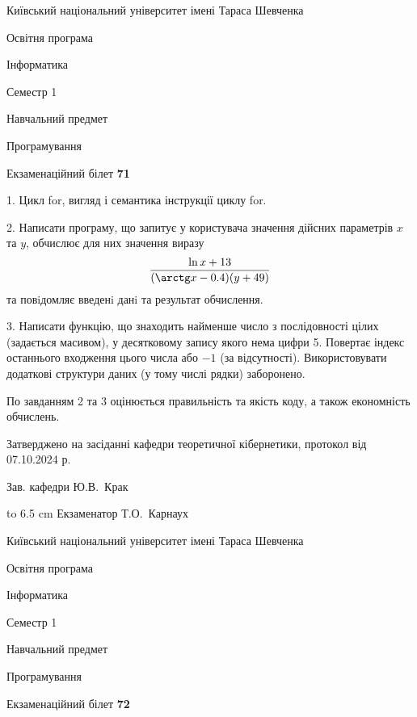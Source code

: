 \documentclass[12pt, ukrainian]{article}
\begin{document}
{{\begin {scriptsize}\par
{ \center  Київський національний університет імені Тараса Шевченка \par}
{\parbox {5 cm}{Освітня програма \hfill}{\parbox {7 cm}{Інформатика\hfill}}\parbox {6 cm}{\hfill Семестр 1}}\par
{\parbox {5 cm} {Навчальний предмет \hfill}\parbox {7 cm}{Програмування \hfill}\parbox {6cm}{\hfill}\par}\vspace{-15pt} \end{scriptsize}}{\center Екзаменаційний білет \No \textbf { 71 }\par}}
{%
1. Цикл for, вигляд і семантика інструкції циклу for.%
\par
2. Написати програму, що запитує у користувача значення дійсних параметрів $x$ та $y$, обчислює для них значення виразу 
$$\frac{\ln x + 13}{(\arctg x - 0.4) (y + 49)}$$ 
та повiдомляє введенi данi та результат обчислення.

\par
3. Написати функцію, що знаходить найменше число з послідовності цілих (задається масивом), у десятковому запису якого нема цифри 5. Повертає індекс останнього входження цього числа або $-1$ (за відсутності). Використовувати додаткові структури даних (у тому числі рядки) заборонено.

По завданням 2 та 3 оцінюється правильність та якість коду, а також економність обчислень.

}
{\smallskip\smallskip \begin {scriptsize} Затверджено на засіданні кафедри теоретичної кібернетики, протокол   від   07.10.2024 р.\par\smallskip\smallskip\smallskip\smallskip
{\parbox {6.5 cm} {Зав. кафедри \dotfill Ю.В.~Крак}}\hspace {0.7cm} {\hbox to 6.5 cm { Екзаменатор \dotfill Т.О.~Карнаух}} \end{scriptsize}}
\vspace{0.9cm}
{{\begin {scriptsize}\par
{ \center  Київський національний університет імені Тараса Шевченка \par}
{\parbox {5 cm}{Освітня програма \hfill}{\parbox {7 cm}{Інформатика\hfill}}\parbox {6 cm}{\hfill Семестр 1}}\par
{\parbox {5 cm} {Навчальний предмет \hfill}\parbox {7 cm}{Програмування \hfill}\parbox {6cm}{\hfill}\par}\vspace{-15pt} \end{scriptsize}}{\center Екзаменаційний білет \No \textbf { 72 }\par}}
\end{document}
